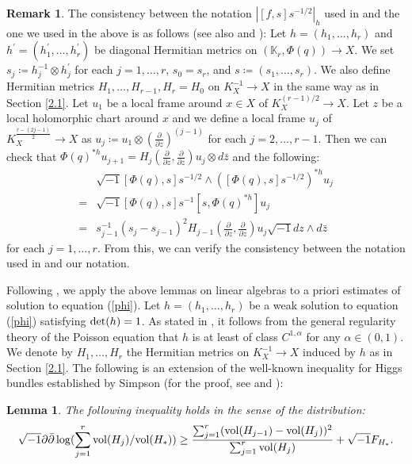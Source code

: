\documentclass[12pt]{article}
\theoremstyle{definition}
\newtheorem{lemm}[defi]{Lemma}
\newtheorem{rem}[defi]{Remark}
\def\det{{\rm det}}
\def\det{{\rm det}}
\def\refe{\ast}
\def\vol{{\rm vol}}
\def\K{{\mathbb K}}
\def\inum{{\sqrt{-1}}}
\begin{document}
\begin{rem} The consistency between the notation $|[f,s]s^{-1/2}|_h$ used in \cite[Lemma 3.10]{LM1} and the one we used in the above is as follows (see also \cite[Lemma 3.1]{Sim1} and \cite[Proof of Lemma 3.10]{LM1}): Let $h=(h_1,\dots, h_r)$ and $h^\prime=(h_1^\prime,\dots, h_r^{\prime})$ be diagonal Hermitian metrics on $(\K_r,\Phi(q))\rightarrow X$. We set $s_j\coloneqq h_j^{-1}\otimes h_j^\prime$ for each $j=1,\dots, r$, $s_0=s_r$, and $s\coloneqq (s_1,\dots, s_r)$. We also define Hermitian metrics $H_1,\dots, H_{r-1}, H_r=H_0$ on $K_X^{-1}\rightarrow X$ in the same way as in Section \ref{2.1}. Let $u_1$ be a local frame around $x\in X$ of $K_X^{(r-1)/2}\rightarrow X$. Let $z$ be a local holomorphic chart around $x$ and we define a local frame $u_j$ of $K_X^{\frac{r-(2j-1)}{2}}\rightarrow X$ as $u_j\coloneqq u_1\otimes (\frac{\partial}{\partial z})^{(j-1)}$ for each $j=2,\dots, r-1$. Then we can check that $\Phi(q)^{\ast h}u_{j+1}=H_j(\frac{\partial}{\partial z}, \frac{\partial}{\partial z})u_j\otimes d\bar{z}$ and the following:
\begin{align*}
&\inum[\Phi(q),s]s^{-1/2}\wedge ([\Phi(q),s]s^{-1/2})^{\ast h} u_j \\
=&\inum[\Phi(q),s]s^{-1}[s,\Phi(q)^{\ast h}]u_j \\
=&s_{j-1}^{-1}(s_j-s_{j-1})^2H_{j-1}\left(\frac{\partial}{\partial z},\frac{\partial}{\partial z}\right)u_j\inum dz\wedge d\bar{z}
\end{align*}
for each $j=1,\dots,r$. From this, we can verify the consistency between the notation used in \cite{LM1} and our notation.
\end{rem}
Following \cite[Section 3]{LM1}, we apply the above lemmas on linear algebras to a priori estimates of solution to equation (\ref{phi}). Let $h=(h_1,\dots, h_r)$ be a weak solution to equation (\ref{phi}) satisfying $\det(h)=1$. As stated in \cite{Miy3}, it follows from the general regularity theory of the Poisson equation that $h$ is at least of class $C^{1,\alpha}$ for any $\alpha\in (0,1)$. We denote by $H_1,\dots, H_r$ the Hermitian metrics on $K_X^{-1}\rightarrow X$ induced by $h$ as in Section \ref{2.1}.
The following is an extension of the well-known inequality for Higgs bundles established by Simpson \cite[Lemma 10.1]{Sim1} (for the proof, see \cite[Proposition 11]{Miy3} and \cite[Proposition 23]{Miy5}):
\begin{lemm}\label{free energy}{\it The following inequality holds in the sense of the distribution: 
\begin{align}
\inum\partial\bar{\partial} \log(\sum_{j=1}^r\vol(H_j)/\vol(H_\refe)) \geq \frac{\sum_{j=1}^r(\vol(H_{j-1})-\vol(H_j))^2}{\sum_{j=1}^r\vol(H_j)}+\inum F_{H_\refe}. \label{well-known}
\end{align}
}
\end{lemm}
\end{document}
